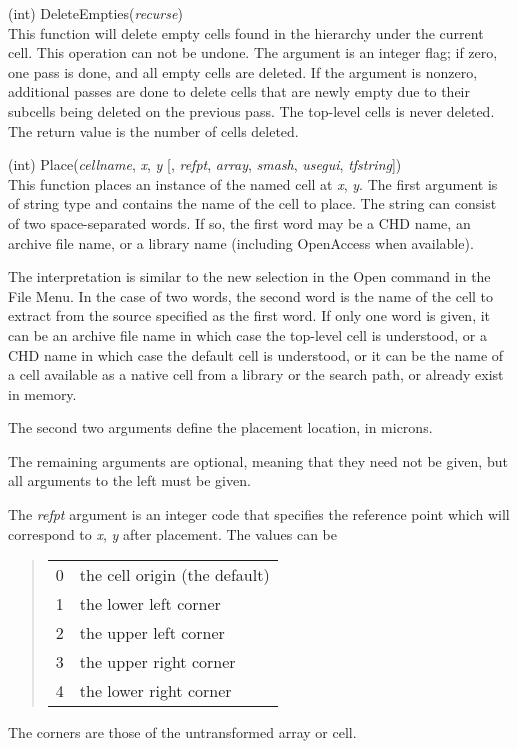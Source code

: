 \begin{description}
\item{(int) \vt DeleteEmpties({\it recurse\/})}\\
This function will delete empty cells found in the hierarchy under the
current cell.  This operation can not be undone.  The argument is an
integer flag; if zero, one pass is done, and all empty cells are
deleted.  If the argument is nonzero, additional passes are done to
delete cells that are newly empty due to their subcells being deleted
on the previous pass.  The top-level cells is never deleted.  The
return value is the number of cells deleted.

\item{(int) \vt Place({\it cellname\/}, {\it x\/}, {\it y\/} [, {\it refpt\/},
  {\it array\/}, {\it smash\/}, {\it usegui\/}, {\it tfstring\/}])}\\
This function places an instance of the named cell at {\it x\/}, {\it
y\/}.  The first argument is of string type and contains the name of
the cell to place.  The string can consist of two space-separated
words.  If so, the first word may be a CHD name, an archive file name,
or a library
name (including OpenAccess when available).

The interpretation is similar to the {\cb new} selection in the {\cb
Open} command in the {\cb File Menu}.  In the case of two words, the
second word is the name of the cell to extract from the source
specified as the first word.  If only one word is given, it can be an
archive file name in which case the top-level cell is understood, or a
CHD name in which case the default cell is understood, or it can be
the name of a cell available as a native cell from a library or the
search path, or already exist in memory.

The second two arguments define the placement location, in microns.

The remaining arguments are optional, meaning that they need not
be given, but all arguments to the left must be given.
       
The {\it refpt} argument is an integer code that specifies the
reference point which will correspond to {\it x\/}, {\it y} after
placement.  The values can be
\begin{quote}
\begin{tabular}{ll}
0 & the cell origin (the default)\\
1 & the lower left corner\\
2 & the upper left corner\\
3 & the upper right corner\\
4 & the lower right corner\\
\end{tabular}
\end{quote}
The corners are those of the untransformed array or cell.
       

\end{description}
